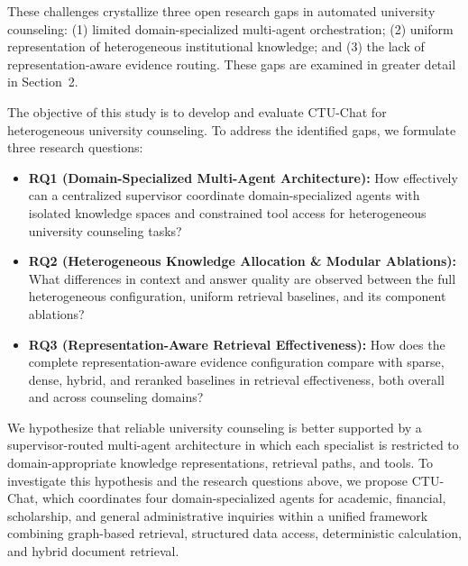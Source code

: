 These challenges crystallize three open research gaps in automated university counseling: (1) limited domain-specialized multi-agent orchestration; (2) uniform representation of heterogeneous institutional knowledge; and (3) the lack of representation-aware evidence routing. These gaps are examined in greater detail in Section~2.

The objective of this study is to develop and evaluate CTU-Chat for heterogeneous university counseling. To address the identified gaps, we formulate three research questions:
\begin{itemize}
    \setlength{\itemsep}{1.5pt}
    \setlength{\parsep}{0pt}
    \setlength{\parskip}{0pt}

    \item \textbf{RQ1 (Domain-Specialized Multi-Agent Architecture):}
    How effectively can a centralized supervisor coordinate domain-specialized agents with isolated knowledge spaces and constrained tool access for heterogeneous university counseling tasks?

    \item \textbf{RQ2 (Heterogeneous Knowledge Allocation \& Modular Ablations):}
    What differences in context and answer quality are observed between the full heterogeneous configuration, uniform retrieval baselines, and its component ablations?

    \item \textbf{RQ3 (Representation-Aware Retrieval Effectiveness):}
    How does the complete representation-aware evidence configuration compare with sparse, dense, hybrid, and reranked baselines in retrieval effectiveness, both overall and across counseling domains?
\end{itemize}

We hypothesize that reliable university counseling is better supported by a supervisor-routed multi-agent architecture in which each specialist is restricted to domain-appropriate knowledge representations, retrieval paths, and tools. To investigate this hypothesis and the research questions above, we propose CTU-Chat, which coordinates four domain-specialized agents for academic, financial, scholarship, and general administrative inquiries within a unified framework combining graph-based retrieval, structured data access, deterministic calculation, and hybrid document retrieval.


